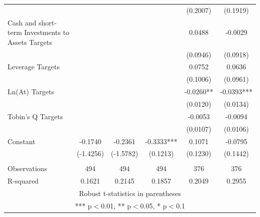 \documentclass[12pt]{article}
\begin{document}
\begin{table}[ht]
\begin{adjustbox}{height=10cm, max width=\textwidth}
\begin{tabular}{lccccc}
				 &  &  &  & (0.2007) & (0.1919) \\
				Cash and short-term Investments to Assets Targets &  &  &  & 0.0488 & -0.0029 \\
				 &  &  &  & (0.0946) & (0.0918) \\
				Leverage Targets &  &  &  & 0.0752 & 0.0636 \\
				 &  &  &  & (0.1006) & (0.0961) \\
				Ln(At) Targets &  &  &  & -0.0260** & -0.0393*** \\
				 &  &  &  & (0.0120) & (0.0134) \\
				Tobin's Q Targets &  &  &  & -0.0053 & -0.0094 \\
				 &  &  &  & (0.0107) & (0.0106) \\
				Constant & -0.1740 & -0.2361 & -0.3333*** & 0.1071 & -0.0795 \\
				 & (-1.4256) & (-1.5782) & (0.1213) & (0.1230) & (0.1442) \\
				 &  &  &  &  &  \\
				Observations & 494 & 494 & 494 & 376 & 376 \\
				 R-squared & 0.1621 & 0.2145 & 0.1857 & 0.2049 & 0.2955 \\ \hline
				\multicolumn{6}{c}{ Robust t-statistics in parentheses} \\
				\multicolumn{6}{c}{ *** p$<$0.01, ** p$<$0.05, * p$<$0.1} \\
				\end{tabular}				
			   
		\end{adjustbox}
	\end{table}
\end{document}
